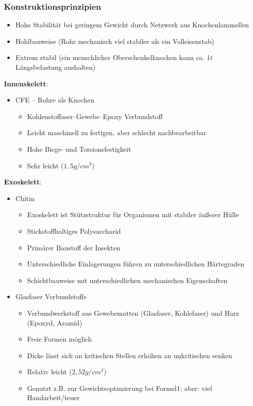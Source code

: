 \subsubsection{Konstruktionsprinzipien}
\begin{itemize}
	\item Hohe Stabilität bei geringem Gewicht durch Netzwerk aus Knochenlammellen
	\item Hohlbauweise (Rohr mechanisch viel stabiler als ein Volleisenstab)
	\item Extrem stabil (ein menschlicher Oberschenkelknochen kann ca. 1$t$ Längsbelastung aushalten)
\end{itemize}
\textbf{Innenskelett}:
\begin{itemize}
	\item CFE -- Rohre als Knochen
	\begin{itemize}
		\item Kohlenstoffaser--Gewebe--Epoxy Verbundstoff
		\item Leicht maschinell zu fertigen, aber schlecht nachbearbeitbar
		\item Hohe Biege- und Torsionsfestigkeit
		\item Sehr leicht ($1,5 g/cm^3$)
	\end{itemize}
\end{itemize}
\textbf{Exoskelett}:
\begin{itemize}
	\item Chitin
	\begin{itemize}
		\item Exoskelett ist Stützstruktur für Organismen mit stabiler äußerer Hülle
		\item Stickstoffhaltiges Polysaccharid
		\item Primärer Baustoff der Insekten
		\item Unterschiedliche Einlagerungen führen zu unterschiedlichen Härtegraden
		\item Schichtbauweise mit unterschiedlichen mechanischen Eigenschaften
	\end{itemize}
	\item Glasfaser Verbundstoffe
	\begin{itemize}
		\item Verbundwerkstoff aus Gewebematten (Glasfaser, Kohlefaser) und Harz (Epoxyd, Aramid)
		\item Freie Formen möglich
		\item Dicke lässt sich an kritischen Stellen erhöhen an unkritischen senken
		\item Relativ leicht ($2,52 g/cm^3$)
		\item Genutzt z.B. zur Gewichtsoptimierung bei Formel1; aber: viel Handarbeit/teuer
	\end{itemize}
\end{itemize}

